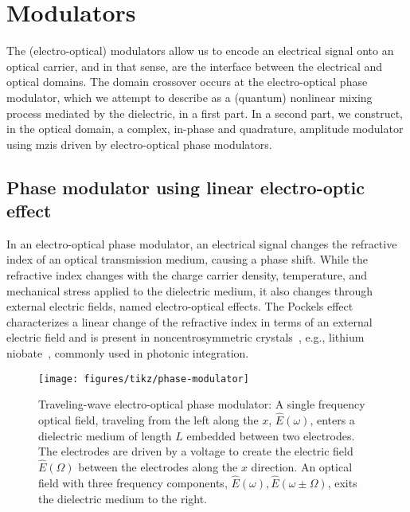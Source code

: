\section{Modulators}

The (electro-optical) modulators allow us to encode an electrical signal onto an optical carrier, and in that sense, are the interface between the electrical and optical domains.
The domain crossover occurs at the electro-optical phase modulator, which we attempt to describe as a (quantum) nonlinear mixing process mediated by the dielectric, in a first part.
In a second part, we construct, in the optical domain, a complex, in-phase and quadrature, amplitude modulator using \gls{mzi}s driven by electro-optical phase modulators.

\subsection{Phase modulator using linear electro-optic effect}

In an electro-optical phase modulator, an electrical signal changes the refractive index of an optical transmission medium, causing a phase shift.
While the refractive index changes with the charge carrier density, temperature, and mechanical stress applied to the dielectric medium, it also changes through external electric fields, named electro-optical effects.
The Pockels effect characterizes a linear change of the refractive index in terms of an external electric field and is present in noncentrosymmetric crystals~\cite[p.~2]{Boyd2020}, e.g., lithium niobate~\cite[p.~237]{Yariv1984}, commonly used in photonic integration.
\begin{figure}[htb]
    \centering
    \texttt{[image: figures/tikz/phase-modulator]}
    \caption{Traveling-wave electro-optical phase modulator: A single frequency optical field, traveling from the left along the $x$, $\hat{E}(\omega)$, enters a dielectric medium of length $L$ embedded between two electrodes. The electrodes are driven by a voltage to create the electric field $\hat{E}(\Omega)$ between the electrodes along the $x$ direction. An optical field with three frequency components, $\hat{E}(\omega),\hat{E}(\omega\pm\Omega)$, exits the dielectric medium to the right.}\label{fig:phase_modulator}
\end{figure}





